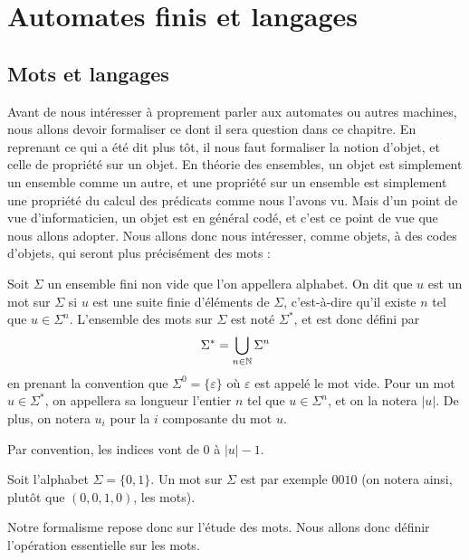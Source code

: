 \section{Automates finis et langages}

\subsection{Mots et langages}

Avant de nous intéresser à proprement parler aux automates ou autres machines, nous allons devoir formaliser ce dont il sera question dans ce chapitre. En reprenant ce qui a été dit plus tôt, il nous faut formaliser la notion d'objet, et celle de propriété sur un objet. En théorie des ensembles, un objet est simplement un ensemble comme un autre, et une propriété sur un ensemble est simplement une propriété du calcul des prédicats comme nous l'avons vu. Mais d'un point de vue d'informaticien, un objet est en général codé, et c'est ce point de vue que nous allons adopter. Nous allons donc nous intéresser, comme objets, à des \og codes d'objets\fg{}, qui seront plus précisément des mots :

\begin{defi}
    Soit $\Sigma$ un ensemble fini non vide que l'on appellera alphabet. On dit que $u$ est un mot sur $\Sigma$ si $u$ est une suite finie d'éléments de $\Sigma$, c'est-à-dire qu'il existe $n$ tel que $u\in\Sigma^n$. L'ensemble des mots sur $\Sigma$ est noté $\Sigma^*$, et est donc défini par $$\Sigma^*=\bigcup_{n\in \mathbb{N}} \Sigma^n$$ en prenant la convention que $\Sigma^0 = \{\varepsilon\}$ où $\varepsilon$ est appelé le mot vide. Pour un mot $u\in \Sigma^*$, on appellera sa longueur l'entier $n$ tel que $u\in\Sigma^n$, et on la notera $|u|$. De plus, on notera $u_i$ pour la $i$\ieme{} composante du mot $u$.
\end{defi}

\begin{rmk}
    Par convention, les indices vont de $0$ à $|u|-1$.
\end{rmk}

\begin{expl}
    Soit l'alphabet $\Sigma=\{0,1\}$. Un mot sur $\Sigma$ est par exemple $0010$ (on notera ainsi, plutôt que $(0,0,1,0)$, les mots).
\end{expl}

Notre formalisme repose donc sur l'étude des mots. Nous allons donc définir l'opération essentielle sur les mots.


